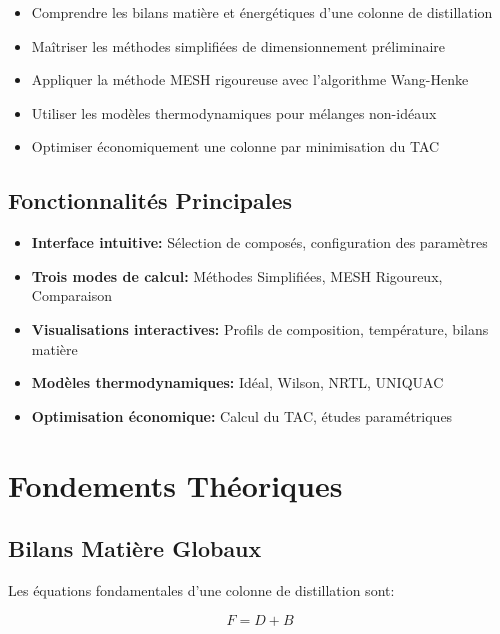 \documentclass[11pt,a4paper]{article}
\begin{document}
\begin{itemize}[leftmargin=*]
    \item Comprendre les bilans matière et énergétiques d'une colonne de distillation
    \item Maîtriser les méthodes simplifiées de dimensionnement préliminaire
    \item Appliquer la méthode MESH rigoureuse avec l'algorithme Wang-Henke
    \item Utiliser les modèles thermodynamiques pour mélanges non-idéaux
    \item Optimiser économiquement une colonne par minimisation du TAC
\end{itemize}

\subsection{Fonctionnalités Principales}

\begin{itemize}[leftmargin=*]
    \item \textbf{Interface intuitive:} Sélection de composés, configuration des paramètres
    \item \textbf{Trois modes de calcul:} Méthodes Simplifiées, MESH Rigoureux, Comparaison
    \item \textbf{Visualisations interactives:} Profils de composition, température, bilans matière
    \item \textbf{Modèles thermodynamiques:} Idéal, Wilson, NRTL, UNIQUAC
    \item \textbf{Optimisation économique:} Calcul du TAC, études paramétriques
\end{itemize}

\section{Fondements Théoriques}

\subsection{Bilans Matière Globaux}

Les équations fondamentales d'une colonne de distillation sont:

\begin{equation}
F = D + B
\end{equation}
\end{document}
